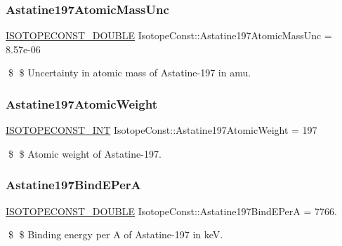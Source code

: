 \subsubsection{\texorpdfstring{Astatine197\+Atomic\+Mass\+Unc}{Astatine197AtomicMassUnc}}
{\footnotesize\ttfamily \mbox{\hyperlink{group___isotope_const-_macros_ga8f45a7272ce02c0b4c65c44636ed719a}{I\+S\+O\+T\+O\+P\+E\+C\+O\+N\+S\+T\+\_\+\+D\+O\+U\+B\+LE}} Isotope\+Const\+::\+Astatine197\+Atomic\+Mass\+Unc = 8.\+57e-\/06}

\$ \$ Uncertainty in atomic mass of Astatine-\/197 in amu. \mbox{\label{group___isotope_const-_astatine-_at197_gab1e9682ec8222c77c43990cc6736916f}} 
\subsubsection{\texorpdfstring{Astatine197\+Atomic\+Weight}{Astatine197AtomicWeight}}
{\footnotesize\ttfamily \mbox{\hyperlink{group___isotope_const-_macros_ga5f18360b3e99483a35c32d789e62621c}{I\+S\+O\+T\+O\+P\+E\+C\+O\+N\+S\+T\+\_\+\+I\+NT}} Isotope\+Const\+::\+Astatine197\+Atomic\+Weight = 197}

\$ \$ Atomic weight of Astatine-\/197. \mbox{\label{group___isotope_const-_astatine-_at197_gac4d60c4e6121199f349b53fcf99a7159}} 
\subsubsection{\texorpdfstring{Astatine197\+Bind\+E\+PerA}{Astatine197BindEPerA}}
{\footnotesize\ttfamily \mbox{\hyperlink{group___isotope_const-_macros_ga8f45a7272ce02c0b4c65c44636ed719a}{I\+S\+O\+T\+O\+P\+E\+C\+O\+N\+S\+T\+\_\+\+D\+O\+U\+B\+LE}} Isotope\+Const\+::\+Astatine197\+Bind\+E\+PerA = 7766.}

\$ \$ Binding energy per A of Astatine-\/197 in keV. \mbox{\label{group___isotope_const-_astatine-_at197_ga6f41737a9e93d45a178ecf8635594930}} 
